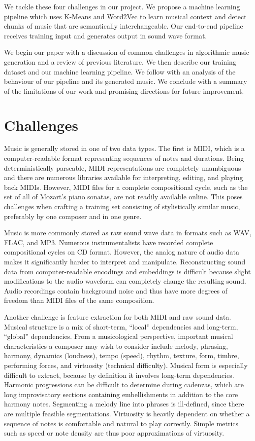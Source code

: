 \documentclass{article}
\begin{document}
We tackle these four challenges in our project. We propose a machine learning pipeline which uses K-Means and Word2Vec to learn musical context and detect chunks of music that are semantically interchangeable. Our end-to-end pipeline receives training input and generates output in sound wave format.

We begin our paper with a discussion of common challenges in algorithmic music generation and a review of previous literature. We then describe our training dataset and our machine learning pipeline. We follow with an analysis of the behaviour of our pipeline and its generated music. We conclude with a summary of the limitations of our work and promising directions for future improvement.

\section{Challenges}

Music is generally stored in one of two data types. The first is MIDI, which is a computer-readable format representing sequences of notes and durations. Being deterministically parseable, MIDI representations are completely unambiguous and there are numerous libraries available for interpreting, editing, and playing back MIDIs. However, MIDI files for a complete compositional cycle, such as the set of all of Mozart's piano sonatas, are not readily available online. This poses challenges when crafting a training set consisting of stylistically similar music, preferably by one composer and in one genre.

Music is more commonly stored as raw sound wave data in formats such as WAV, FLAC, and MP3. Numerous instrumentalists have recorded complete compositional cycles on CD format. However, the analog nature of audio data makes it significantly harder to interpret and manipulate. Reconstructing sound data from computer-readable encodings and embeddings is difficult because slight modifications to the audio waveform can completely change the resulting sound. Audio recordings contain background noise and thus have more degrees of freedom than MIDI files of the same composition.

Another challenge is feature extraction for both MIDI and raw sound data. Musical structure is a mix of short-term, ``local'' dependencies and long-term, ``global'' dependencies. From a musicological perspective, important musical characteristics a composer may wish to consider include melody, phrasing, harmony, dynamics (loudness), tempo (speed), rhythm, texture, form, timbre, performing forces, and virtuosity (technical difficulty). Musical form is especially difficult to extract, because by definition it involves long-term dependencies. Harmonic progressions can be difficult to determine during cadenzas, which are long improvisatory sections containing embellishments in addition to the core harmony notes. Segmenting a melody line into phrases is ill-defined, since there are multiple feasible segmentations. Virtuosity is heavily dependent on whether a sequence of notes is comfortable and natural to play correctly. Simple metrics such as speed or note density are thus poor approximations of virtuosity.
\end{document}
